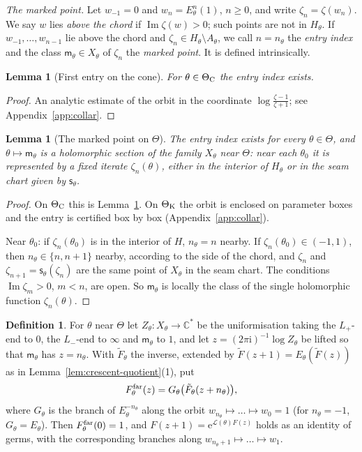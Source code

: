 \documentclass[11pt]{amsart}
\newtheorem{lemma}[theorem]{Lemma}
\theoremstyle{definition}
\newtheorem{definition}[theorem]{Definition}
\newcommand{\eee}{\mathrm{e}}
\newcommand{\ii}{\mathrm{i}}
\begin{document}
\emph{The marked point.}  Let $w_{-1}=0$ and $w_n=E_\theta^n(1)$, $n\ge0$, and write
$\zeta_n=\zeta(w_n)$.  We say $w$ lies \emph{above the chord} if $\operatorname{Im}\zeta(w)>0$; such points are
not in $H_\theta$.  If $w_{-1},\dots,w_{n-1}$ lie above the chord and $\zeta_n\in H_\theta\setminus A_\theta$, we
call $n=n_\theta$ the \emph{entry index} and the class $\mathsf m_\theta\in X_\theta$ of $\zeta_n$ the
\emph{marked point}.  It is defined intrinsically.

\begin{lemma}[First entry on the cone]\label{lem:far-cone}
For $\theta\in\Theta_{\rm C}$ the entry index exists.
\end{lemma}

\begin{proof}
An analytic estimate of the orbit in the coordinate $\log\frac{\zeta-1}{\zeta+1}$; see
Appendix~\ref{app:collar}.
\end{proof}

\begin{lemma}[The marked point on $\Theta$]\label{lem:far-mark}
The entry index exists for every $\theta\in\Theta$, and $\theta\mapsto\mathsf m_\theta$ is a holomorphic section
of the family $X_\theta$ near $\Theta$: near each $\theta_0$ it is represented by a fixed iterate
$\zeta_n(\theta)$, either in the interior of $H_\theta$ or in the seam chart given by $\mathsf s_\theta$.
\end{lemma}

\begin{proof}
On $\Theta_{\rm C}$ this is Lemma~\ref{lem:far-cone}.  On $\Theta_{\rm K}$ the orbit is enclosed on
parameter boxes and the entry is certified box by box (Appendix~\ref{app:collar}).

Near $\theta_0$: if $\zeta_n(\theta_0)$ is in the interior of $H$, $n_\theta=n$ nearby.  If $\zeta_n(\theta_0)\in(-1,1)$,
then $n_\theta\in\{n,n+1\}$ nearby, according to the side of the chord, and $\zeta_n$ and
$\zeta_{n+1}=\mathsf s_\theta(\zeta_n)$ are the same point of $X_\theta$ in the seam chart.  The conditions
$\operatorname{Im}\zeta_m>0$, $m<n$, are open.  So $\mathsf m_\theta$ is locally the class of the single holomorphic
function $\zeta_n(\theta)$.
\end{proof}

\begin{definition}\label{def:far-solution}
For $\theta$ near $\Theta$ let $Z_\theta:X_\theta\to\mathbb C^*$ be the uniformisation taking the
$L_+$-end to $0$, the $L_-$-end to $\infty$ and $\mathsf m_\theta$ to $1$, and let
$z=(2\pi\ii)^{-1}\log Z_\theta$ be lifted so that $\mathsf m_\theta$ has $z=n_\theta$.  With $\tilde F_\theta$ the inverse, extended by
$\tilde F(z+1)=E_\theta(\tilde F(z))$ as in Lemma~\ref{lem:crescent-quotient}(1), put
\[
 F^{\rm far}_\theta(z)=G_\theta\bigl(\tilde F_\theta(z+n_\theta)\bigr),
\]
where $G_\theta$ is the branch of $E_\theta^{-n_\theta}$ along the orbit $w_{n_\theta}\mapsto\dots\mapsto w_0=1$ (for
$n_\theta=-1$, $G_\theta=E_\theta$).  Then $F^{\rm far}_\theta(0)=1$, and $F(z+1)=\eee^{\mathcal L(\theta)F(z)}$ holds as an identity
of germs, with the corresponding branches along $w_{n_\theta+1}\mapsto\dots\mapsto w_1$.
\end{definition}
\end{document}
